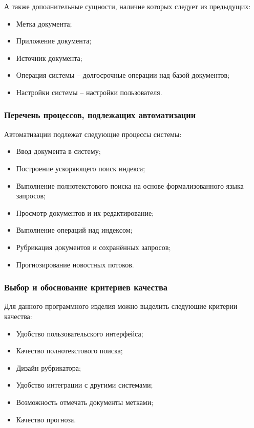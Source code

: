 А также дополнительные сущности, наличие которых следует из предыдущих:
\begin{itemize}
\item Метка документа;
\item Приложение документа;
\item Источник документа;
\item Операция системы -- долгосрочные операции над базой документов;
\item Настройки системы -- настройки пользователя.
\end{itemize}

\subsubsection{Перечень процессов, подлежащих автоматизации}
Автоматизации подлежат следующие процессы системы:
\begin{itemize}
\item Ввод документа в систему;
\item Построение ускоряющего поиск индекса;
\item Выполнение полнотекстового поиска на основе формализованного языка
запросов;
\item Просмотр документов и их редактирование;
\item Выполнение операций над индексом;
\item Рубрикация документов и сохранённых запросов;
\item Прогнозирование новостных потоков.
\end{itemize}

\subsubsection{Выбор и обоснование критериев качества}

Для данного программного изделия можно выделить следующие критерии качества:
\begin{itemize}
\item Удобство пользовательского интерфейса;
\item Качество полнотекстового поиска;
\item Дизайн рубрикатора;
\item Удобство интеграции с другими системами;
\item Возможность отмечать документы метками;
\item Качество прогноза.
\end{itemize}

